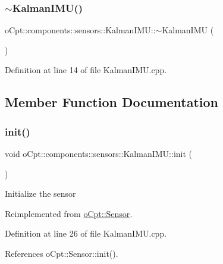 \subsubsection{\texorpdfstring{$\sim$\+Kalman\+I\+M\+U()}{~KalmanIMU()}}
{\footnotesize\ttfamily o\+Cpt\+::components\+::sensors\+::\+Kalman\+I\+M\+U\+::$\sim$\+Kalman\+I\+MU (\begin{DoxyParamCaption}{ }\end{DoxyParamCaption})}



Definition at line 14 of file Kalman\+I\+M\+U.\+cpp.



\subsection{Member Function Documentation}
\hypertarget{classo_cpt_1_1components_1_1sensors_1_1_kalman_i_m_u_a0d2dfbc9cc468e32f9c58f0a8c92c3ca}{}\label{classo_cpt_1_1components_1_1sensors_1_1_kalman_i_m_u_a0d2dfbc9cc468e32f9c58f0a8c92c3ca} 
\subsubsection{\texorpdfstring{init()}{init()}}
{\footnotesize\ttfamily void o\+Cpt\+::components\+::sensors\+::\+Kalman\+I\+M\+U\+::init (\begin{DoxyParamCaption}{ }\end{DoxyParamCaption})\hspace{0.3cm}{\ttfamily [virtual]}}

Initialize the sensor 

Reimplemented from \hyperlink{classo_cpt_1_1_sensor_aa612a305a9a3091dd62cd1afb9d4dd7d}{o\+Cpt\+::\+Sensor}.



Definition at line 26 of file Kalman\+I\+M\+U.\+cpp.



References o\+Cpt\+::\+Sensor\+::init().

